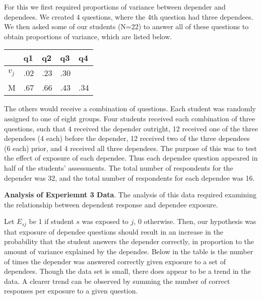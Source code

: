 For this we first required proportions of variance between depender and
dependees.  We created 4 questions, where the 4th question had three dependees.
We then asked some of our students (N=22) to answer all of these questions to
obtain proportions of variance, which are listed below.  

\begin{center}
\begin{tabular}{|l|l|l|l|l|}
                                  \hline
      &   q1 &  q2  & q3 & q4  \\ \hline
$v_j$ &  .02 & .23 & .30 &     \\ \hline
 M    &  .67 & .66 & .43 & .34 \\ \hline
\end{tabular}
\end{center}

The others would receive a combination of questions.  Each student was randomly
assigned to one of eight groups.  Four students received each combination of
three questions, such that 4 received the depender outright, 12 received one of
the three dependees (4 each) before the depender, 12 received two of the three
dependees (6 each) prior, and 4 received all three dependees.  The purpose of
this was to test the effect of exposure of each dependee.  Thus each dependee
question appeared in half of the students' assessments.  The total number of
respondents for the depender was 32, and the total number of respondents for
each dependee was 16.  

\textbf{Analysis of Experiemnt 3 Data}.  The analysis of this data required
examining the relationship between dependent response and dependee exposure.

Let $E_{sj}$ be 1 if student $s$ was exposed to $j$, 0 otherwise.  Then, our
hypothesis was that exposure of dependee questions should result in an increase
in the probability that the student answers the depender correctly, in
proportion to the amount of variance explained by the dependee.  Below in the
table is the number of times the depender was answered correctly given
exposure to a set of dependees.  Though the data set is small, there does
appear to be a trend in the data.  A clearer trend can be observed by summing
the number of correct responses per exposure to a given question.

